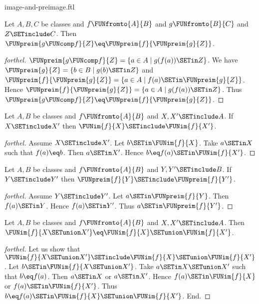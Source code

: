 \documentclass{stex}
\begin{document}
\begin{smodule}{image-and-preimage.ftl}
\begin{proposition}[forthel,id=FOUNDATIONS_07_6824917886566400]
  Let $A, B, C$ be classes and $f \FUNfromto{A}{B}$ and $g \FUNfromto{B}{C}$ and $Z \SETinclude C$.
  Then $\FUNpreim{g \FUNcomp f}{Z} \eq \FUNpreim{f}{\FUNpreim{g}{Z}}$.
\end{proposition}
\begin{proof}[forthel]
  $\FUNpreim{g \FUNcomp f}{Z} = \{ a \in A \mid g(f(a)) \SETin Z \}$.
  We have $\FUNpreim{g}{Z} = \{ b \in B \mid g(b) \SETin Z \}$ and $\FUNpreim{f}{\FUNpreim{g}{Z}} = \{ a \in A \mid f(a) \SETin \FUNpreim{g}{Z} \}$.
  Hence $\FUNpreim{f}{\FUNpreim{g}{Z}} = \{ a \in A \mid g(f(a)) \SETin Z \}$.
  Thus $\FUNpreim{g \FUNcomp f}{Z} \eq \FUNpreim{f}{\FUNpreim{g}{Z}}$.
\end{proof}

\begin{proposition}[forthel,id=FOUNDATIONS_07_7396318576115712]
  Let $A, B$ be classes and $f \FUNfromto{A}{B}$ and $X, X' \SETinclude A$.
  If $X \SETinclude X'$ then $\FUNim{f}{X} \SETinclude \FUNim{f}{X'}$.
\end{proposition}
\begin{proof}[forthel]
  Assume $X \SETinclude X'$.
  Let $b \SETin \FUNim{f}{X}$.
  Take $a \SETin X$ such that $f(a) \eq b$.
  Then $a \SETin X'$.
  Hence $b \eq f(a) \SETin \FUNim{f}{X'}$.
\end{proof}

\begin{proposition}[forthel,id=FOUNDATIONS_07_8376448628817920]
  Let $A, B$ be classes and $f \FUNfromto{A}{B}$ and $Y, Y' \SETinclude B$.
  If $Y \SETinclude Y'$ then $\FUNpreim{f}{Y} \SETinclude \FUNpreim{f}{Y'}$.
\end{proposition}
\begin{proof}[forthel]
  Assume $Y \SETinclude Y'$.
  Let $a \SETin \FUNpreim{f}{Y}$.
  Then $f(a) \SETin Y$.
  Hence $f(a) \SETin Y'$.
  Thus $a \SETin \FUNpreim{f}{Y'}$.
\end{proof}

\begin{proposition}[forthel,id=FOUNDATIONS_07_4448961469349888]
  Let $A, B$ be classes and $f \FUNfromto{A}{B}$ and $X, X' \SETinclude A$.
  Then $\FUNim{f}{X \SETunion X'} \eq \FUNim{f}{X} \SETunion \FUNim{f}{X'}$.
\end{proposition}
\begin{proof}[forthel]
  Let us show that $\FUNim{f}{X \SETunion X'} \SETinclude \FUNim{f}{X} \SETunion \FUNim{f}{X'}$.
    Let $b \SETin \FUNim{f}{X \SETunion X'}$.
    Take $a \SETin X \SETunion X'$ such that $b \eq f(a)$.
    Then $a \SETin X$ or $a \SETin X'$.
    Hence $f(a) \SETin \FUNim{f}{X}$ or $f(a) \SETin \FUNim{f}{X'}$.
    Thus $b \eq f(a) \SETin \FUNim{f}{X} \SETunion \FUNim{f}{X'}$.
  End.


\end{proof}
\end{smodule}
\end{document}
